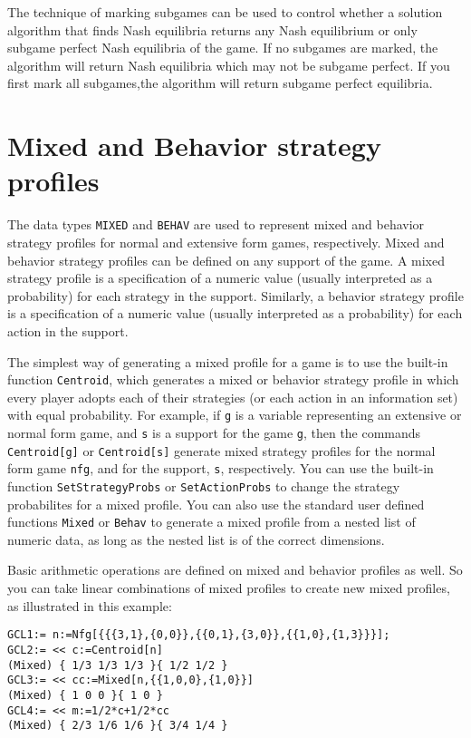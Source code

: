 The technique of marking subgames can be used to control whether a
solution algorithm that finds Nash equilibria returns any Nash
equilibrium or only subgame perfect Nash equilibria of the game.  If
no subgames are marked, the algorithm will return Nash equilibria
which may not be subgame perfect.  If you first mark all subgames,the
algorithm will return subgame perfect equilibria.

\section{Mixed and Behavior strategy profiles}

The data types \texttt{MIXED} and \texttt{BEHAV} are used to represent
mixed and behavior strategy profiles for normal and extensive form
games, respectively.  Mixed and behavior strategy profiles can be
defined on any support of the game.  A mixed strategy profile is a
specification of a numeric value (usually interpreted as a
probability) for each strategy in the support.  Similarly, a behavior
strategy profile is a specification of a numeric value (usually
interpreted as a probability) for each action in the support.

The simplest way of generating a mixed profile for a game is to use
the built-in function \texttt{Centroid}, which generates a mixed or
behavior strategy profile in which every player adopts each of their
strategies (or each action in an information set) with equal
probability.  For example, if \verb+g+ is a variable representing an
extensive or normal form game, and \verb+s+ is a support for the game
\verb+g+, then the commands \verb+Centroid[g]+ or \verb+Centroid[s]+
generate mixed strategy profiles for the normal form game \verb+nfg+,
and for the support, \verb+s+, respectively.  You can use the built-in
function \texttt{SetStrategyProbs} or \texttt{SetActionProbs} to change
the strategy probabilites for a mixed profile.  You can also use the
standard user defined functions \texttt{Mixed} or \texttt{Behav} to
generate a mixed profile from a nested list of numeric data, as long
as the nested list is of the correct dimensions.

Basic arithmetic operations are defined on mixed and behavior profiles
as well.  So you can take linear combinations of mixed profiles to
create new mixed profiles, as illustrated in this example:

\begin{verbatim}  
GCL1:= n:=Nfg[{{{3,1},{0,0}},{{0,1},{3,0}},{{1,0},{1,3}}}];
GCL2:= << c:=Centroid[n]
(Mixed) { 1/3 1/3 1/3 }{ 1/2 1/2 }
GCL3:= << cc:=Mixed[n,{{1,0,0},{1,0}}]
(Mixed) { 1 0 0 }{ 1 0 }
GCL4:= << m:=1/2*c+1/2*cc
(Mixed) { 2/3 1/6 1/6 }{ 3/4 1/4 }
\end{verbatim}

